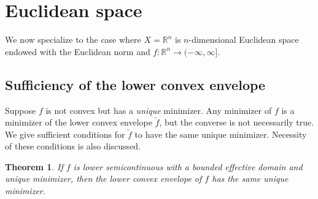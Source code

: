 \documentclass[12pt]{article}
\newtheorem{theorem}{Theorem}
\begin{document}
\section{Euclidean space}

We now specialize to the case where $X=\mathbb{R}^{n}$ is $n$-dimensional Euclidean space endowed with the Euclidean norm and $f : \mathbb{R}^{n} \rightarrow (-\infty,\infty]$.


\subsection{Sufficiency of the lower convex envelope}

Suppose $f$ is not convex but has a \emph{unique} minimizer.
Any minimizer of $f$ is a minimizer of the lower convex envelope $\breve{f}$, but the converse is not necessarily true.
We give sufficient conditions for $\breve{f}$ to have the same unique minimizer.
Necessity of these conditions is also discussed.

\begin{theorem}
If $f$ is lower semicontinuous with a bounded effective domain and unique minimizer, then the lower convex envelope of $f$ has the same unique minimizer.
\end{theorem}
\end{document}
